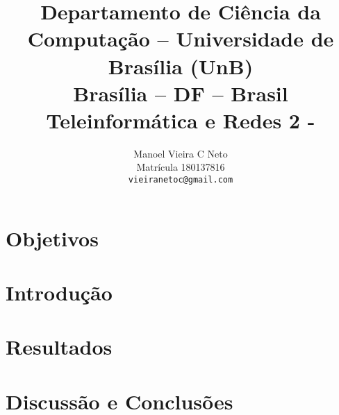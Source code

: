\documentclass[10pt,twocolumn,letterpaper]{article}
\begin{document}
\title{Departamento de Ciência da Computação -- Universidade de Brasília (UnB)\\
  Brasília -- DF -- Brasil\\
  Teleinformática e Redes 2 - \\
}

\author{
Manoel Vieira C Neto\\ 
Matrícula 180137816\\
{\tt\small vieiranetoc@gmail.com}
\and
}
\maketitle

\begin{abstract}
  

\end{abstract}
   
\section{Objetivos}
    
\section{Introdução}

 




\section{Resultados}


\section{Discussão e Conclusões}

{\small


}
\end{document}
